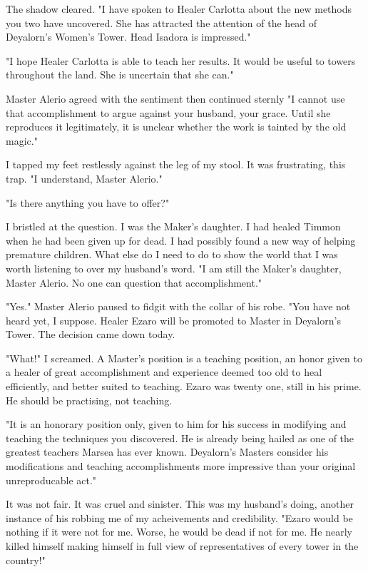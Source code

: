 \documentclass{article}
\begin{document}
The shadow cleared. "I have spoken to Healer Carlotta about the new methods you two have uncovered. She has attracted the attention of the head of Deyalorn's Women's Tower. Head Isadora is impressed."

"I hope Healer Carlotta is able to teach her results. It would be useful to towers throughout the land. She is uncertain that she can."

Master Alerio agreed with the sentiment then continued sternly "I cannot use that accomplishment to argue against your husband, your grace. Until she reproduces it legitimately, it is unclear whether the work is tainted by the old magic." 

I tapped my feet restlessly against the leg of my stool. It was frustrating, this trap. "I understand, Master Alerio."

"Is there anything you have to offer?"

I bristled at the question. I was the Maker's daughter. I had healed Timmon when he had been given up for dead. I had possibly found a new way of helping premature children. What else do I need to do to show the world that I was worth listening to over my husband's word. "I am still the Maker's daughter, Master Alerio. No one can question that accomplishment."

"Yes." Master Alerio paused to fidgit with the collar of his robe. "You have not heard yet, I suppose. Healer Ezaro will be promoted to Master in Deyalorn's Tower. The decision came down today.

"What!" I screamed. A Master's position is a teaching position, an honor given to a healer of great accomplishment and experience deemed too old to heal efficiently, and better suited to teaching. Ezaro was twenty one, still in his prime. He should be practising, not teaching.

"It is an honorary position only, given to him for his success in modifying and teaching the techniques you discovered. He is already being hailed as one of the greatest teachers Marsea has ever known. Deyalorn's Masters consider his modifications and teaching accomplishments more impressive than your original unreproducable act."

It was not fair. It was cruel and sinister. This was my husband's doing, another instance of his robbing me of my acheivements and credibility. "Ezaro would be nothing if it were not for me. Worse, he would be dead if not for me. He nearly killed himself making himself in full view of representatives of every tower in the country!"
\end{document}
